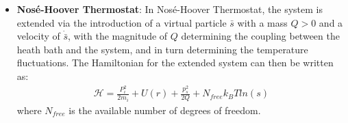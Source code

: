\begin{itemize}
        \item \textbf{Nos\'{e}-Hoover Thermostat}\supercite{nose_molecular_1984,hoover_canonical_1985}: In Nos\'{e}-Hoover Thermostat, the system is extended via the introduction of a virtual particle $\bar{s}$ with a mass $Q > 0$ and a velocity of $\dot{\bar{s}}$, with the magnitude of $Q$ determining the coupling between the heath bath and the system, and in turn determining the temperature fluctuations. The Hamiltonian for the extended system can then be written as:
        \begin{align*}
            \mathcal{H} = \frac{P_i^2}{2m_i} + U(r) + \frac{p_s^2}{2Q} + N_{free}k_BTln(s) 
        \end{align*}
        where $N_{free}$ is the available number of degrees of freedom.
    \end{itemize}

